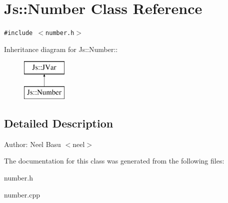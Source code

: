 \section{Js::Number Class Reference}
\label{classJs_1_1Number}
{\tt \#include $<$number.h$>$}

Inheritance diagram for Js::Number::\begin{figure}[H]
\begin{center}
\leavevmode
\includegraphics[height=2cm]{classJs_1_1Number}
\end{center}
\end{figure}


\subsection{Detailed Description}
\begin{Desc}
\item[Author:]Neel Basu $<$neel$>$ \end{Desc}


The documentation for this class was generated from the following files:\begin{CompactItemize}
\item 
number.h\item 
number.cpp\end{CompactItemize}
